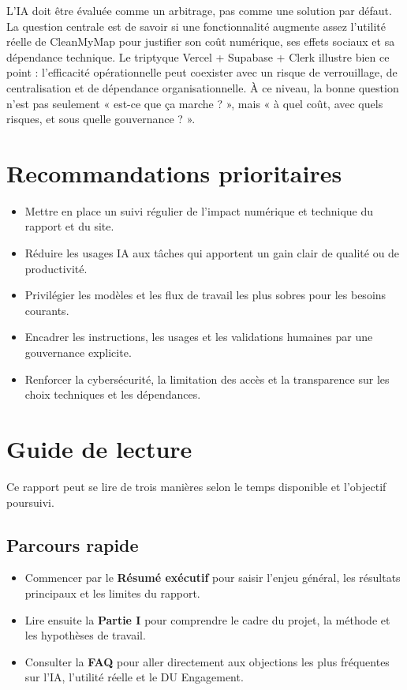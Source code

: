 \documentclass[
  10pt,
  a4paper,
  DIV=11,
  numbers=noendperiod,
  oneside]{scrreprt}
\providecommand{\tightlist}{%
  \setlength{\itemsep}{0pt}\setlength{\parskip}{0pt}}
\let\oldtextbf\textbf
\renewcommand{\textbf}[1]{\oldtextbf{\textcolor{cmmnavy}{#1}}}
\begin{document}
L'IA doit être évaluée comme un arbitrage, pas comme une solution par
défaut. La question centrale est de savoir si une fonctionnalité
augmente assez l'utilité réelle de CleanMyMap pour justifier son coût
numérique, ses effets sociaux et sa dépendance technique. Le triptyque
Vercel + Supabase + Clerk illustre bien ce point : l'efficacité
opérationnelle peut coexister avec un risque de verrouillage, de
centralisation et de dépendance organisationnelle. À ce niveau, la bonne
question n'est pas seulement « est-ce que ça marche ? », mais « à quel
coût, avec quels risques, et sous quelle gouvernance ? ».

\section{Recommandations
prioritaires}\label{recommandations-prioritaires}

\begin{itemize}
\tightlist
\item
  Mettre en place un suivi régulier de l'impact numérique et technique
  du rapport et du site.
\item
  Réduire les usages IA aux tâches qui apportent un gain clair de
  qualité ou de productivité.
\item
  Privilégier les modèles et les flux de travail les plus sobres pour
  les besoins courants.
\item
  Encadrer les instructions, les usages et les validations humaines par
  une gouvernance explicite.
\item
  Renforcer la cybersécurité, la limitation des accès et la transparence
  sur les choix techniques et les dépendances.
\end{itemize}

\section{Guide de lecture}\label{guide-de-lecture}

Ce rapport peut se lire de trois manières selon le temps disponible et
l'objectif poursuivi.

\subsection{Parcours rapide}\label{parcours-rapide}

\begin{itemize}
\tightlist
\item
  Commencer par le \textbf{Résumé exécutif} pour saisir l'enjeu général,
  les résultats principaux et les limites du rapport.
\item
  Lire ensuite la \textbf{Partie I} pour comprendre le cadre du projet,
  la méthode et les hypothèses de travail.
\item
  Consulter la \textbf{FAQ} pour aller directement aux objections les
  plus fréquentes sur l'IA, l'utilité réelle et le DU Engagement.
\end{itemize}
\end{document}
